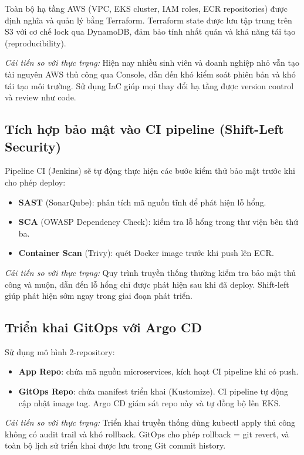 \documentclass[12pt,a4paper]{article}
\begin{document}
Toàn bộ hạ tầng AWS (VPC, EKS cluster, IAM roles, ECR repositories) được định nghĩa và quản lý bằng Terraform. Terraform state được lưu tập trung trên S3 với cơ chế lock qua DynamoDB, đảm bảo tính nhất quán và khả năng tái tạo (reproducibility).

\textit{Cải tiến so với thực trạng:} Hiện nay nhiều sinh viên và doanh nghiệp nhỏ vẫn tạo tài nguyên AWS thủ công qua Console, dẫn đến khó kiểm soát phiên bản và khó tái tạo môi trường. Sử dụng IaC giúp mọi thay đổi hạ tầng được version control và review như code.

\subsection{Tích hợp bảo mật vào CI pipeline (Shift-Left Security)}

Pipeline CI (Jenkins) sẽ tự động thực hiện các bước kiểm thử bảo mật trước khi cho phép deploy:
\begin{itemize}[leftmargin=*,nosep]
  \item \textbf{SAST} (SonarQube): phân tích mã nguồn tĩnh để phát hiện lỗ hổng.
  \item \textbf{SCA} (OWASP Dependency Check): kiểm tra lỗ hổng trong thư viện bên thứ ba.
  \item \textbf{Container Scan} (Trivy): quét Docker image trước khi push lên ECR.
\end{itemize}

\textit{Cải tiến so với thực trạng:} Quy trình truyền thống thường kiểm tra bảo mật thủ công và muộn, dẫn đến lỗ hổng chỉ được phát hiện sau khi đã deploy. Shift-left giúp phát hiện sớm ngay trong giai đoạn phát triển.

\subsection{Triển khai GitOps với Argo CD}

Sử dụng mô hình 2-repository:
\begin{itemize}[leftmargin=*,nosep]
  \item \textbf{App Repo}: chứa mã nguồn microservices, kích hoạt CI pipeline khi có push.
  \item \textbf{GitOps Repo}: chứa manifest triển khai (Kustomize). CI pipeline tự động cập nhật image tag. Argo CD giám sát repo này và tự đồng bộ lên EKS.
\end{itemize}

\textit{Cải tiến so với thực trạng:} Triển khai truyền thống dùng kubectl apply thủ công không có audit trail và khó rollback. GitOps cho phép rollback = git revert, và toàn bộ lịch sử triển khai được lưu trong Git commit history.
\end{document}
